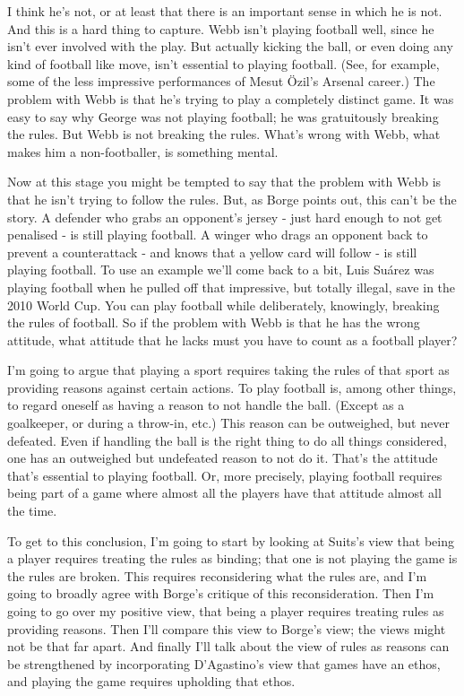 \documentclass[
  11pt,
  letterpaper,
  DIV=11,
  numbers=noendperiod,
  oneside]{scrartcl}
\begin{document}
I think he's not, or at least that there is an important sense in which
he is not. And this is a hard thing to capture. Webb isn't playing
football well, since he isn't ever involved with the play. But actually
kicking the ball, or even doing any kind of football like move, isn't
essential to playing football. (See, for example, some of the less
impressive performances of Mesut Özil's Arsenal career.) The problem
with Webb is that he's trying to play a completely distinct game. It was
easy to say why George was not playing football; he was gratuitously
breaking the rules. But Webb is not breaking the rules. What's wrong
with Webb, what makes him a non-footballer, is something mental.

Now at this stage you might be tempted to say that the problem with Webb
is that he isn't trying to follow the rules. But, as Borge points out,
this can't be the story. A defender who grabs an opponent's jersey - just hard
enough to not get penalised - is still playing football. A winger who
drags an opponent back to prevent a counterattack - and knows that a
yellow card will follow - is still playing football. To use an example
we'll come back to a bit, Luis Suárez was playing football when he
pulled off that impressive, but totally illegal, save in the 2010 World
Cup. You can play football while deliberately, knowingly, breaking the
rules of football. So if the problem with Webb is that he has the wrong
attitude, what attitude that he lacks must you have to count as a
football player?

I'm going to argue that playing a sport requires taking the rules of
that sport as providing reasons against certain actions. To play
football is, among other things, to regard oneself as having a reason to
not handle the ball. (Except as a goalkeeper, or during a throw-in,
etc.) This reason can be outweighed, but never defeated. Even if
handling the ball is the right thing to do all things considered, one
has an outweighed but undefeated reason to not do it. That's the
attitude that's essential to playing football. Or, more precisely,
playing football requires being part of a game where almost all the
players have that attitude almost all the time.

To get to this conclusion, I'm going to start by looking at Suits's view
that being a player requires treating the rules as binding; that one is
not playing the game is the rules are broken. This requires
reconsidering what the rules are, and I'm going to broadly agree with
Borge's critique of this reconsideration. Then I'm going to go over my
positive view, that being a player requires treating rules as providing
reasons. Then I'll compare this view to Borge's view; the views might
not be that far apart. And finally I'll talk about the view of rules as
reasons can be strengthened by incorporating D'Agastino's view that
games have an ethos, and playing the game requires upholding that ethos.
\end{document}
